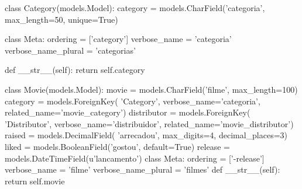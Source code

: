 \documentclass[aspectratio=169]{beamer}
\begin{document}
\begin{frame}[fragile]

\begin{pythoncode}
	class Category(models.Model):
	    category = models.CharField('categoria',
	                                max_length=50, unique=True)

	    class Meta:
	        ordering = ['category']
	        verbose_name = 'categoria'
	        verbose_name_plural = 'categorias'

	    def __str__(self):
	        return self.category

\end{pythoncode}

\end{frame}


\begin{frame}[fragile]

\begin{pythoncode}
	class Movie(models.Model):
	    movie = models.CharField('filme', max_length=100)
	    category = models.ForeignKey(
	        'Category', verbose_name='categoria',
	        related_name='movie_category')
	    distributor = models.ForeignKey(
	        'Distributor', verbose_name='distribuidor',
	        related_name='movie_distributor')
	    raised = models.DecimalField(
	             'arrecadou', max_digits=4, decimal_places=3)
	    liked = models.BooleanField('gostou', default=True)
	    release = models.DateTimeField(u'lancamento')
	    class Meta:
	        ordering = ['-release']
	        verbose_name = 'filme'
	        verbose_name_plural = 'filmes'
	    def __str__(self):
	        return self.movie
\end{pythoncode}


\end{frame}
\end{document}
